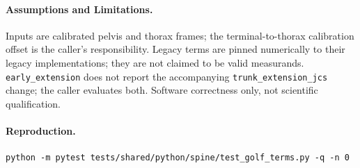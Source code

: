 \paragraph{Assumptions and Limitations.}
Inputs are calibrated pelvis and thorax frames; the terminal-to-thorax calibration
offset is the caller's responsibility. Legacy terms are pinned numerically to
their legacy implementations; they are not claimed to be valid measurands.
\texttt{early\_extension} does not report the accompanying
\texttt{trunk\_extension\_jcs} change; the caller evaluates both. Software
correctness only, not scientific qualification.

\paragraph{Reproduction.}
\begin{verbatim}
python -m pytest tests/shared/python/spine/test_golf_terms.py -q -n 0
\end{verbatim}

